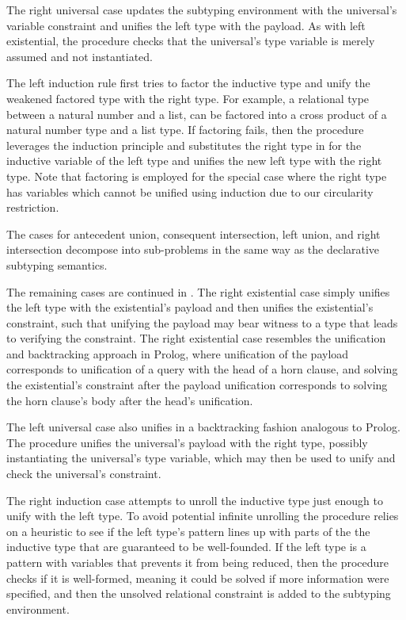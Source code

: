 \documentclass[acmsmall]{acmart}
\begin{document}
The right universal case updates the subtyping environment with the universal's variable constraint
and unifies the left type with the payload. As with left existential, the procedure checks that
the universal's type variable is merely assumed and not instantiated.

The left induction rule first tries to factor the inductive type and unify the weakened factored type
with the right type. For example, a relational type between a natural number and a list, can be factored into
a cross product of a natural number type and a list type. 
If factoring fails, then the procedure leverages the induction principle and substitutes the right type 
in for the inductive variable of the left type and unifies the new left type with the right type.    
Note that factoring is employed for the special
case where the right type has variables which cannot be unified 
using induction due to our circularity restriction.  

The cases for antecedent union, consequent intersection, left union, and right intersection
decompose into sub-problems in the same way as the declarative subtyping semantics.

The remaining cases are continued in .
The right existential case simply unifies the left type with the existential's payload
and then unifies the existential's constraint, such that unifying the payload
may bear witness to a type that leads to verifying the constraint. 
The right existential case resembles the unification and backtracking approach in Prolog, 
where unification of the payload corresponds to unification of a query with the head of a horn clause,
and solving the existential's constraint after the payload unification corresponds to
solving the horn clause's body after the head's unification.  

The left universal case also unifies in a backtracking fashion analogous to Prolog.
The procedure unifies the universal's payload with the right type,
possibly instantiating the universal's type variable,
which may then be used to unify and check the universal's constraint.

The right induction case attempts to unroll the inductive type just enough
to unify with the left type. To avoid potential infinite unrolling
the procedure relies on a heuristic to see if the left type's pattern
lines up with parts of the the inductive type that are guaranteed to be well-founded. 
If the left type is a pattern with variables that prevents it from being reduced,
then the procedure checks if it is well-formed, meaning it could be solved 
if more information were specified, and then the unsolved relational constraint
is added to the subtyping environment. 
\end{document}
